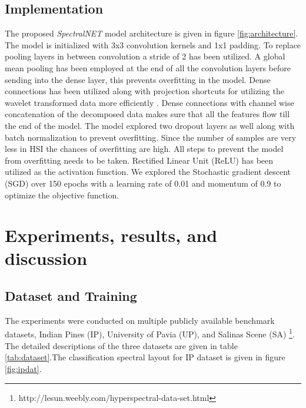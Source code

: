 \documentclass[journal]{IEEEtran}
\begin{document}
\subsection{Implementation}
The proposed \textit{SpectralNET} model architecture is given in figure \ref{fig:architecture}. The model is initialized with 3x3 convolution kernels and 1x1 padding. To replace pooling layers in between convolution a stride of 2 has been utilized. A global mean pooling has been employed at the end of all the convolution layers before sending into the dense layer, this prevents overfitting in the model. Dense connections has been utilized along with projection shortcuts for utilizing the wavelet transformed data more efficiently \cite{he2016deep} \cite{huang2017densely}. Dense connections with channel wise concatenation of the decomposed data makes sure that all the features flow till the end of the model. The model explored two dropout layers as well along with batch normalization to prevent overfitting. Since the number of samples are very less in HSI the chances of overfitting are high. All steps to prevent the model from overfitting needs to be taken. Rectified Linear Unit (ReLU) has been utilized as the activation function. We explored the Stochastic gradient descent (SGD) over 150 epochs with a learning rate of 0.01 and momentum of 0.9 to optimize the objective function. 




\section{Experiments, results, and discussion}

\begin{figure*}[]
\centering
{}\quad
{}\quad
{}\quad
{}\quad
\caption{Image cube, spectral ground truth, and spectral prediction for Indian Pines Dataset along with legend.}
\label{fig:ipdat}
\end{figure*} 




\subsection{Dataset and Training}
The experiments were conducted on multiple publicly available benchmark datasets, Indian Pines (IP), University of Pavia (UP), and Salinas Scene (SA) \footnote{http://lesun.weebly.com/hyperspectral-data-set.html}. The detailed descriptions of the three datasets are given in table \ref{tab:dataset}.The classification spectral layout for IP dataset is given in figure \ref{fig:ipdat}.
\end{document}
